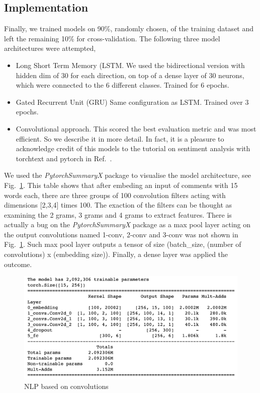 \documentclass{report}
\begin{document}
\subsection{Implementation}

Finally, we trained models on 90\%, randomly chosen, of the training dataset and left the remaining 10\% 
for cross-validation. The following three model architectures were attempted, 
\begin{itemize}
\item Long Short Term Memory (LSTM. We used the 
bidirectional version with hidden dim of 30 for each direction, on top of a dense layer of 30 neurons, 
which were connected to the 6 different classes. Trained for 6 epochs. 

\item Gated Recurrent Unit (GRU) Same configuration 
as LSTM. Trained over 3 epochs. 
\item Convolutional approach. This scored the best evaluation metric
and was most efficient. So we describe it in more detail. In fact, it is a pleasure
to acknowledge credit of this models to the tutorial on sentiment analysis with 
torchtext and pytorch in Ref.~\cite{BT}.
\end{itemize}

We used the \emph{PytorchSummaryX} package to visualise the model architecture, see  
Fig.~\ref{fig:cnn}. This table shows that after embeding an input of comments with 15 words each, there are 
three groups of 100 convolution filters acting with dimensions [2,3,4] times 100. The exaction of the filters can be thought as examining the 
2 grams, 3 grams and 4 grams to extract features.  There is actually a bug on the \emph{PytorchSummaryX} 
package as a max pool layer  acting
on the output convolutions named 1-conv,  2-conv and 3-conv was not shown in Fig.~\ref{fig:cnn}. Such max pool layer outputs a tensor of size 
(batch\_size, (number of convolutions) x (embedding size)). Finally, a dense layer was applied the outcome. 
\begin{figure}[!h]
\centering
  \includegraphics[width=150mm]{../local/plots_tables/cnn.png}
  \caption{NLP based on convolutions}
  \label{fig:cnn}
\end{figure}
\end{document}
